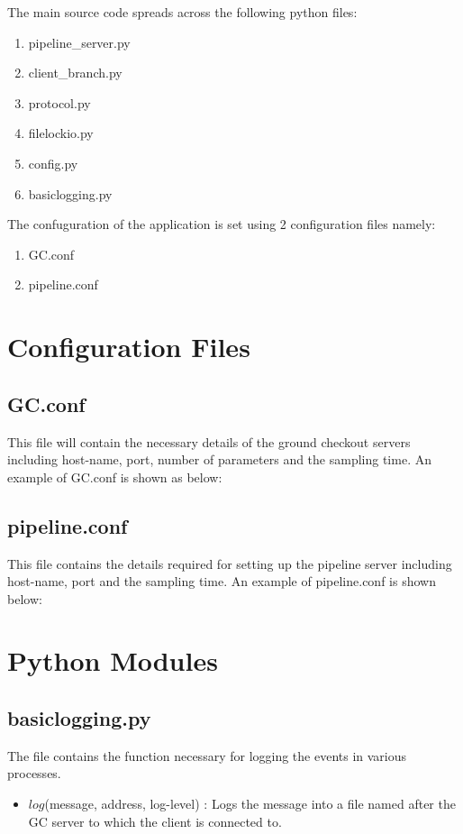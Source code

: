 The main source code spreads across the following python files:
\begin{enumerate}
	\item pipeline\_server.py
	\item client\_branch.py
	\item protocol.py
	\item filelockio.py
	\item config.py
	\item basiclogging.py
\end{enumerate}
The confuguration of the application is set using 2 configuration files namely:
\begin{enumerate}
	\item GC.conf
	\item pipeline.conf
\end{enumerate}

\section{Configuration Files}

\subsection{GC.conf}
This file will contain the necessary details of the ground checkout servers
including host-name, port, number of parameters and the sampling time. An example
of GC.conf is shown as below:


\subsection{pipeline.conf}
This file contains the details required for setting up the pipeline server
including host-name, port and the sampling time. An example of pipeline.conf is
shown below:



\section{Python Modules}

\subsection{basiclogging.py}
The file contains the function necessary for logging the events in various
processes.
\begin{itemize}
	\item $log$(message, address, log-level) : Logs the message
			into a file named after the GC server to which the client is
			connected to.
\end{itemize}

